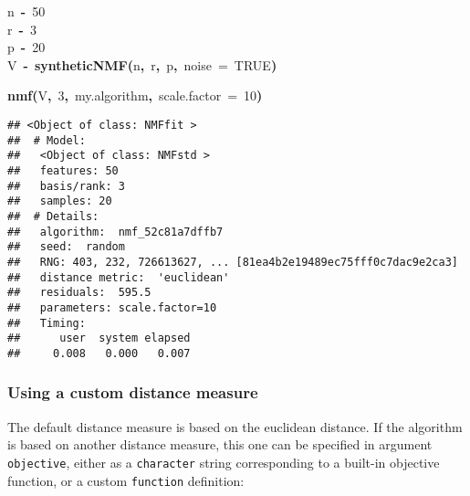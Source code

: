 \documentclass[a4paper]{article}\usepackage{graphicx, color}
\makeatletter
\newcommand{\hlnumber}[1]{\textcolor[rgb]{0,0,0}{#1}}%
\newcommand{\hlfunctioncall}[1]{\textcolor[rgb]{0.501960784313725,0,0.329411764705882}{\textbf{#1}}}%
\newcommand{\hlkeyword}[1]{\textcolor[rgb]{0,0,0}{\textbf{#1}}}%
\newcommand{\hlargument}[1]{\textcolor[rgb]{0.690196078431373,0.250980392156863,0.0196078431372549}{#1}}%
\newcommand{\hlassignement}[1]{\textcolor[rgb]{0,0,0}{\textbf{#1}}}%
\newcommand{\hlsymbol}[1]{\textcolor[rgb]{0,0,0}{#1}}%
\newcommand{\hlstd}[1]{\textcolor[rgb]{0,0,0}{#1}}%
\newenvironment{kframe}{%
 \def\FrameCommand##1{\hskip\@totalleftmargin \hskip-\fboxsep
 \colorbox{shadecolor}{##1}\hskip-\fboxsep
     \hskip-\linewidth \hskip-\@totalleftmargin \hskip\columnwidth}%
 \MakeFramed {\advance\hsize-\width
   \@totalleftmargin\z@ \linewidth\hsize
   \@setminipage}}%
 {\par\unskip\endMakeFramed}
\newenvironment{knitrout}{}{} %
\let\code=\texttt
\makeatother
\begin{document}
\begin{knitrout}
\color{fgcolor}\begin{kframe}
\begin{flushleft}
\ttfamily\noindent
\hlsymbol{n}{\ }\hlassignement{\usebox{\hlnormalsizeboxlessthan}-}{\ }\hlnumber{50}\hspace*{\fill}\\
\hlstd{}\hlsymbol{r}{\ }\hlassignement{\usebox{\hlnormalsizeboxlessthan}-}{\ }\hlnumber{3}\hspace*{\fill}\\
\hlstd{}\hlsymbol{p}{\ }\hlassignement{\usebox{\hlnormalsizeboxlessthan}-}{\ }\hlnumber{20}\hspace*{\fill}\\
\hlstd{}\hlsymbol{V}{\ }\hlassignement{\usebox{\hlnormalsizeboxlessthan}-}{\ }\hlfunctioncall{syntheticNMF}\hlkeyword{(}\hlsymbol{n}\hlkeyword{,}{\ }\hlsymbol{r}\hlkeyword{,}{\ }\hlsymbol{p}\hlkeyword{,}{\ }\hlargument{noise}{\ }\hlargument{=}{\ }\hlnumber{TRUE}\hlkeyword{)}\mbox{}
\normalfont
\end{flushleft}
\end{kframe}
\end{knitrout}


\begin{knitrout}
\color{fgcolor}\begin{kframe}
\begin{flushleft}
\ttfamily\noindent
\hlfunctioncall{nmf}\hlkeyword{(}\hlsymbol{V}\hlkeyword{,}{\ }\hlnumber{3}\hlkeyword{,}{\ }\hlsymbol{my.algorithm}\hlkeyword{,}{\ }\hlargument{scale.factor}{\ }\hlargument{=}{\ }\hlnumber{10}\hlkeyword{)}\mbox{}
\normalfont
\end{flushleft}
\begin{verbatim}
## <Object of class: NMFfit >
##  # Model:
##   <Object of class: NMFstd >
##   features: 50 
##   basis/rank: 3 
##   samples: 20 
##  # Details:
##   algorithm:  nmf_52c81a7dffb7 
##   seed:  random 
##   RNG: 403, 232, 726613627, ... [81ea4b2e19489ec75fff0c7dac9e2ca3]
##   distance metric:  'euclidean' 
##   residuals:  595.5 
##   parameters: scale.factor=10 
##   Timing:
##      user  system elapsed 
##     0.008   0.000   0.007 
\end{verbatim}
\end{kframe}
\end{knitrout}


\subsubsection{Using a custom distance measure}
The default distance measure is based on the euclidean distance. 
If the algorithm is based on another distance measure, this one can be specified in argument \code{objective}, either as a \code{character} string corresponding to a built-in objective function, or a custom \code{function} definition:
\end{document}
